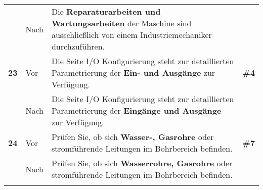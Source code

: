 \begin{longtable}{llp{}l}
& Nach & Die \textbf{Reparaturarbeiten und Wartungsarbeiten} der Maschine sind ausschließlich von einem Industriemechaniker durchzuführen. & \\
\tablevspace
{ \textbf{23}} & Vor & Die Seite I/O Konfigurierung steht zur detaillierten Parametrierung der \textbf{Ein- und Ausgänge} zur Verfügung. & \textbf{\#4}\\
& Nach & Die Seite I/O Konfigurierung steht zur detaillierten Parametrierung der \textbf{Eingänge und Ausgänge} zur Verfügung. & \\
\tablevspace
{ \textbf{24}} & Vor & Prüfen Sie, ob sich \textbf{Wasser-, Gasrohre} oder stromführende Leitungen im Bohrbereich befinden. & \textbf{\#7}\\
& Nach & Prüfen Sie, ob sich \textbf{Wasserrohre, Gasrohre} oder stromführende Leitungen im Bohrbereich befinden. & \\
\lspbottomrule
\end{longtable}
